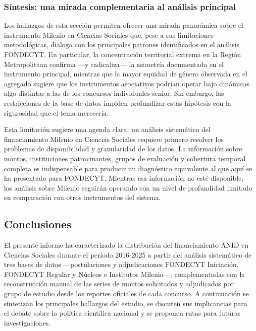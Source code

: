 \documentclass[
  12pt,
  letterpaper,
]{article}
\begin{document}
\subsubsection{Síntesis: una mirada complementaria al análisis
principal}\label{suxedntesis-una-mirada-complementaria-al-anuxe1lisis-principal}

Los hallazgos de esta sección permiten ofrecer una mirada panorámica
sobre el instrumento Milenio en Ciencias Sociales que, pese a sus
limitaciones metodológicas, dialoga con los principales patrones
identificados en el análisis FONDECYT. En particular, la concentración
territorial extrema en la Región Metropolitana confirma ---y
radicaliza--- la asimetría documentada en el instrumento principal,
mientras que la mayor equidad de género observada en el agregado sugiere
que los instrumentos asociativos podrían operar bajo dinámicas algo
distintas a las de los concursos individuales senior. Sin embargo, las
restricciones de la base de datos impiden profundizar estas hipótesis
con la rigurosidad que el tema merecería.

Esta limitación sugiere una agenda clara: un análisis sistemático del
financiamiento Milenio en Ciencias Sociales requiere primero resolver
los problemas de disponibilidad y granularidad de los datos. La
información sobre montos, instituciones patrocinantes, grupos de
evaluación y cobertura temporal completa es indispensable para producir
un diagnóstico equivalente al que aquí se ha presentado para FONDECYT.
Mientras esa información no esté disponible, los análisis sobre Milenio
seguirán operando con un nivel de profundidad limitado en comparación
con otros instrumentos del sistema.

\subsection{Conclusiones}\label{conclusiones}

El presente informe ha caracterizado la distribución del financiamiento
ANID en Ciencias Sociales durante el período 2016-2025 a partir del
análisis sistemático de tres bases de datos ---postulaciones y
adjudicaciones FONDECYT Iniciación, FONDECYT Regular y Núcleos e
Institutos Milenio---, complementadas con la reconstrucción manual de
las series de montos solicitados y adjudicados por grupo de estudio
desde los reportes oficiales de cada concurso. A continuación se
sintetizan los principales hallazgos del estudio, se discuten sus
implicancias para el debate sobre la política científica nacional y se
proponen rutas para futuras investigaciones.
\end{document}
